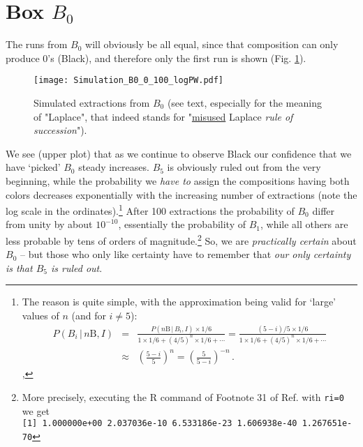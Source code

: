 \documentclass[11pt]{article}
\begin{document}
\section{Box $B_0$}
The runs from $B_0$ 
will obviously be all equal, since that composition can only 
produce 0's (Black), and therefore only the first run is shown
(Fig. \ref{fig:Simulazione_B0}). 
\begin{figure}
\centerline{\texttt{[image: Simulation\_B0\_0\_100\_logPW.pdf]}}
\caption{\small \sf Simulated extractions from $B_0$ (see text, 
especially for the meaning of "Laplace", that indeed stands for
"\underline{misused} Laplace {\em rule of succession}").}
\label{fig:Simulazione_B0}
\end{figure}
We see (upper plot) that as we continue 
to observe Black our confidence  that we have 
`picked' $B_0$ steady increases. $B_5$ is obviously ruled
out from the very beginning, while the probability
we {\em have to} assign
the compositions having both colors
 decreases exponentially
 with the increasing number of extractions 
(note the log scale in the ordinates).\footnote{The reason is quite simple,
with the approximation being
valid for `large' values of $n$ (and for $i\ne 5$):
\begin{eqnarray*}
P(B_i\,|\,n\mbox{B},I) &=& \frac{P(n\mbox{B}\,|\,B_i,I)\times 1/6}
    {1\times 1/6 + (4/5)^n\times 1/6 + \cdots} 
= \frac{(5-i)/5\times 1/6}
    {1\times 1/6 + (4/5)^n\times 1/6 + \cdots} \\
 &\approx& \left(\frac{5-i}{5}\right)^n = \left(\frac{5}{5-i}\right)^{-n}\,.   
\end{eqnarray*}
\label{fn:exponential_PBi},
 }
After 100 extractions the probability of $B_0$ differ from unity 
by about $10^{-10}$, essentially the probability of $B_1$, while 
all others are less probable by tens of orders of 
magnitude.\footnote{More precisely, executing the R command
of Footnote 31 of Ref. \cite{ME2016} with \verb|ri=0| we get \\
\verb|[1] 1.000000e+00 2.037036e-10 6.533186e-23 1.606938e-40 1.267651e-70|
} So, we are {\em practically certain} about $B_0$ --  but 
those who only like certainty have to remember
that {\em our only certainty is that $B_5$ is ruled out}.
\end{document}
